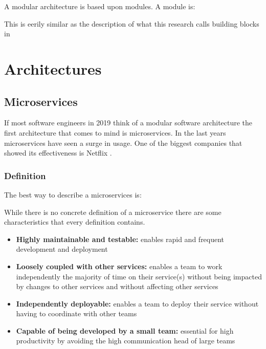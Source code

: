 A modular architecture is based upon modules. A module is:

This is eerily similar as the description of what this research calls building blocks in 

\section{Architectures}
\label{sec:Architectures}

\subsection{Microservices}
If most software engineers in 2019 think of a modular software architecture the first architecture that comes to mind is microservices. In the last years microservices have seen a surge in usage. One of the biggest companies that showed its effectiveness is Netflix \cite{microservicesNetflix}.

\subsubsection{Definition}
The best way to describe a microservices is:

While there is no concrete definition of a microservice there are some characteristics that
every definition contains.
\begin{itemize}
        \item \textbf{Highly maintainable and testable:} enables rapid and frequent development and deployment

        \item \textbf{Loosely coupled with other services:} enables a team to work independently the majority of time on their service(s) without being impacted by changes to other services and without affecting other services

        \item \textbf{Independently deployable:} enables a team to deploy their service without having to coordinate with other teams

        \item \textbf{Capable of being developed by a small team:} essential for high productivity by avoiding the high communication head of large teams \cite{microservicesCharactaristics}
\end{itemize}

